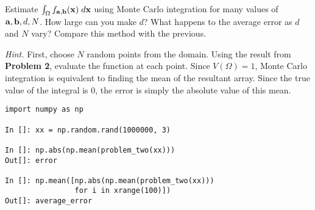 \break
\begin{problem}
\label{prob:mc}
Estimate $\int_{\Omega} f_{{\bf a},{\bf b}}({\bf x}) \;d{\bf x}$ using Monte Carlo integration
for many values of ${\bf a}, {\bf b}, d, N$. How large can you make $d$? What
happens to the average error as $d$ and $N$ vary? Compare this method with the
previous.

\nopagebreak[2]

\vspace{5mm}
\noindent
{\it Hint.} First, choose $N$ random points from the domain. Using the result
from {\bf Problem 2}, evaluate the function at each point. Since $V(\Omega) =
1$, Monte Carlo integration is equivalent to finding the mean of the resultant
array. Since the true value of the integral is $0$, the error is simply the
absolute value of this mean.

\nopagebreak[2]

\begin{verbatim}
import numpy as np

In []: xx = np.random.rand(1000000, 3)

In []: np.abs(np.mean(problem_two(xx)))
Out[]: error

In []: np.mean([np.abs(np.mean(problem_two(xx)))
                for i in xrange(100)])
Out[]: average_error
\end{verbatim}
\end{problem}
